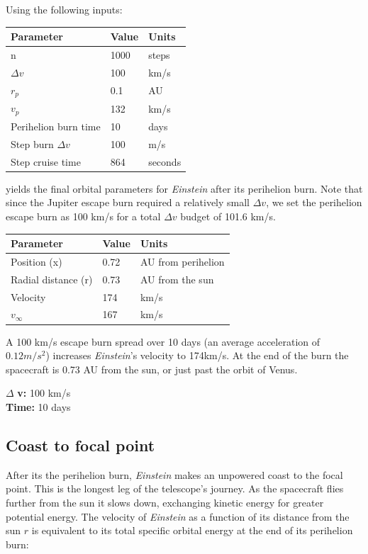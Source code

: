 \documentclass[12pt]{article} %
\begin{document}
Using the following inputs:

\begin{center}
\begin{tabular}{|m{4 cm}| m{4 cm}| m{4 cm}|} \hline
\textbf{Parameter} & \textbf{Value} & \textbf{Units}\\ \hline
n & 1000& steps\\ \hline
$\Delta v$ & 100& km/s \\ \hline
$r_p$      &  0.1& AU\\ \hline
$v_p$     &  132 & km/s\\ \hline
Perihelion burn time & 10 & days \\ \hline
Step burn $\Delta v$ & 100 & m/s\\ \hline
Step cruise time & 864& seconds \\ \hline
\end{tabular}
\end{center}

yields the final orbital parameters for \textit{Einstein} after its perihelion burn. Note that since the Jupiter escape burn required a relatively small $\Delta v$, we set the perihelion escape burn as 100 km/s for a total $\Delta v$ budget of 101.6 km/s. 

\begin{center}
\begin{tabular}{|m{4 cm}| m{4 cm}| m{4 cm}|} \hline
\textbf{Parameter} & \textbf{Value} & \textbf{Units}\\ \hline
Position (x) & 0.72 & AU from perihelion\\ \hline
Radial distance (r) & 0.73& AU from the sun\\ \hline
Velocity      &  174 & km/s\\ \hline
$v_{\infty}$     &  167& km/s\\ \hline
\end{tabular}
\end{center}

A 100 km/s escape burn spread over 10 days (an average acceleration of $0.12m/s^2$) increases \textit{Einstein}'s velocity to 174km/s. At the end of the burn the spacecraft is 0.73 AU from the sun, or just past the orbit of Venus.


$\Delta$ \textbf{v:} 100 km/s\\
\textbf{Time:} 10 days\\

\subsection{Coast to focal point}
After its the perihelion burn, \textit{Einstein} makes an unpowered coast to the focal point. This is the longest leg of the telescope's journey. As the spacecraft flies further from the sun it slows down, exchanging kinetic energy for greater potential energy. The velocity of \textit{Einstein} as a function of its distance from the sun $r$ is equivalent to its total specific orbital energy at the end of its perihelion burn:
\end{document}
